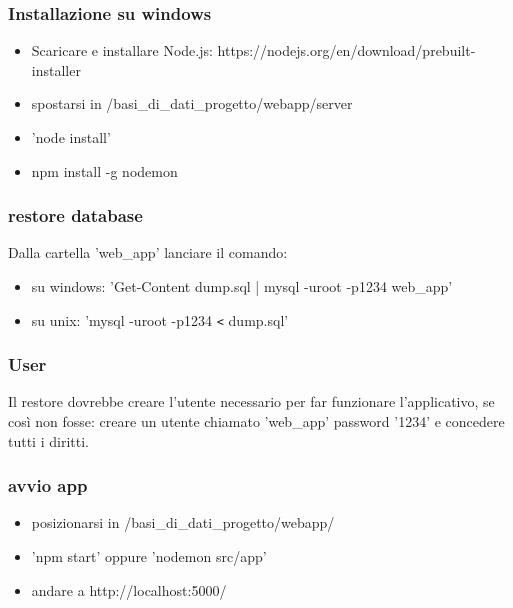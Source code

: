 \subsubsection{Installazione su windows}
\begin{itemize}
\item Scaricare e installare Node.js: https://nodejs.org/en/download/prebuilt-installer
\item spostarsi in /basi{\_}di{\_}dati{\_}progetto/webapp/server
\item 'node install'
\item npm install -g nodemon
\end{itemize}


\subsubsection{restore database}
Dalla cartella 'web{\_}app' lanciare il comando:
\begin{itemize}
\item su windows: 'Get-Content dump.sql | mysql -uroot -p1234 web{\_}app'
\item su unix: 'mysql -uroot -p1234 \texttt{<} dump.sql'
\end{itemize}

\subsubsection{User}
Il restore dovrebbe creare l'utente necessario per far funzionare l'applicativo, se così non fosse: creare un utente chiamato 'web{\_}app' password '1234' e concedere tutti i diritti.

\subsubsection{avvio app}
\begin{itemize}
\item  posizionarsi in /basi{\_}di{\_}dati{\_}progetto/webapp/
\item  'npm start' oppure 'nodemon src/app'
\item  andare a http://localhost:5000/
\end{itemize}